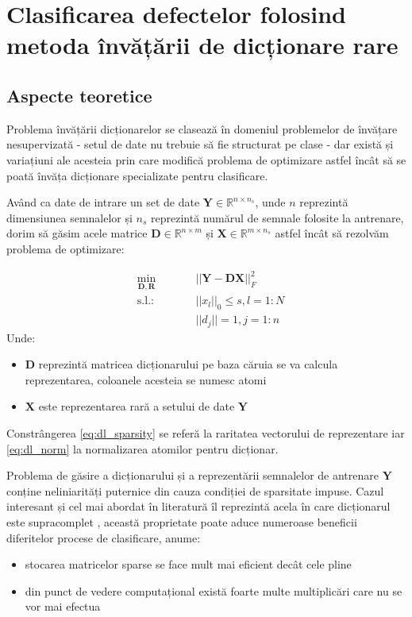 \chapter{Clasificarea defectelor folosind metoda învățării de dicționare rare}
\label{chap:dictionary_learning}
\section{Aspecte teoretice}
Problema învățării dicționarelor se clasează în domeniul problemelor de învățare nesupervizată - setul de date nu trebuie să fie structurat pe clase - dar există și variațiuni ale acesteia prin care modifică problema de optimizare astfel încât să se poată învăța dicționare specializate pentru clasificare.

Având ca date de intrare un set de date $\mathbf{Y} \in \mathbb{R}^{n \times n_s}$, unde $n$ reprezintă dimensiunea semnalelor și $n_s$ reprezintă numărul de semnale folosite la antrenare, dorim să găsim acele matrice $\mathbf{D} \in \mathbb{R}^{n \times m}$ și $\mathbf{X} \in \mathbb{R}^{m \times n_s}$ astfel încât să rezolvăm problema de optimizare\cite[Capitol 2]{DL_book}:

\begin{subequations}
\begin{alignat}{2}
&\!\min_{\mathbf{D}, \mathbf{R}}        &\qquad& ||\mathbf{Y} - \mathbf{D} \mathbf{X} ||^{2}_{F} \label{eq:dl_opt}\\
&\text{s.l.:} &      & ||x_l||_0  \leq s, l = 1:N \label{eq:dl_sparsity}\\
& & & ||d_j|| = 1, j = 1:n \label{eq:dl_norm}
\end{alignat}
\label{eq:dl_opt_problem}
\end{subequations}
Unde:
\begin{itemize}
    \item $\mathbf{D}$ reprezintă matricea dicționarului pe baza căruia se va calcula reprezentarea, coloanele acesteia se numesc atomi
    \item $\mathbf{X}$ este reprezentarea rară a setului de date $\mathbf{Y}$
\end{itemize}

Constrângerea \eqref{eq:dl_sparsity} se referă la raritatea vectorului de reprezentare iar \eqref{eq:dl_norm} la normalizarea atomilor pentru dicționar.

Problema de găsire a dicționarului și a reprezentării semnalelor de antrenare $\mathbf{Y}$ conține neliniarități puternice din cauza condiției de sparsitate impuse. Cazul interesant și cel mai abordat în literatură îl reprezintă acela în care dicționarul este supracomplet \cite[Capitolul 1]{DL_book}, această proprietate poate aduce numeroase beneficii diferitelor procese de clasificare, anume:
\begin{itemize}
    \item stocarea matricelor sparse se face mult mai eficient decât cele pline
    \item din punct de vedere computațional există foarte multe multiplicări care nu se vor mai efectua
\end{itemize}

